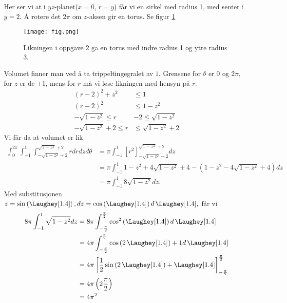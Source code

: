 \documentclass[11pt, a4paper, norsk]{NTNUoving}
\begin{document}
\begin{oppgave}
Her ser vi at i $yz$-planet($x=0$, $r=y$) får vi en sirkel med radius 1, med senter i $y=2$. Å rotere det $2\pi$ om $z$-aksen gir en torus. Se figur \ref{fig:my_label}
\begin{figure}
    \centering
    \texttt{[image: fig.png]}
    \caption{Likningen i oppgave 2 ga en torus med indre radius 1 og ytre radius 3.}
    \label{fig:my_label}
\end{figure}

Volumet finner man ved å ta trippeltingegralet av $1$. Grensene for $\theta$ er $0$ og $2\pi$, for $z$ er de $\pm 1$, mens for $r$ må vi løse likningen med hensyn på $r$. 
\begin{align*}
    (r-2)^2+z^2 &\leq 1\\
    (r-2)^2 &\leq 1-z^2\\
    -\sqrt{1-z^2} \leq r&-2 \leq \sqrt{1-z^2}\\
    -\sqrt{1-z^2}+2 \leq r& \leq \sqrt{1-z^2}+2
\end{align*}
Vi får da at volumet er lik
\begin{align*}
    \int_0^{2\pi}\int_{-1}^1\int_{-\sqrt{1-z^2}+2}^{\sqrt{1-z^2}+2}rdrdzd\theta&=\pi\int_{-1}^1\left[r^2\right]_{-\sqrt{1-z^2}+2}^{\sqrt{1-z^2}+2}dz
    \\&=\pi\int_{-1}^{1}1-z^2+4\sqrt{1-z^2}+4-(1-z^2-4\sqrt{1-z^2}+4)dz
    \\&=\pi\int_{-1}^{1}8\sqrt{1-z^2}dz.
\end{align*}
Med substitusjonen $z=\sin\left(\Laughey[1.4]\right), dz=\cos\left(\Laughey[1.4]\right)d\, \Laughey[1.4],$ får vi
\begin{align*}
    8\pi\int_{-1}^{1}\sqrt{1-z^2}dz&=8\pi \int_{-\frac{\pi}{2}}^{\frac{\pi}{2}}\cos^2 \left(\Laughey[1.4]\right) d\, \Laughey[1.4]
    \\&=4\pi\int_{-\frac{\pi}{2}}^{\frac{\pi}{2}}\cos \left(2\, \Laughey[1.4]\right) +1d\, \Laughey[1.4]
    \\&=4\pi \left[\frac{1}{2}\sin \left(2\, \Laughey[1.4]\right) + \Laughey[1.4] \right]_{-\frac{\pi}{2}}^{\frac{\pi}{2}}
    \\&=4\pi\left(2\frac{\pi}{2}\right)
    \\&=4\pi^2
\end{align*}
\end{oppgave}
\end{document}
